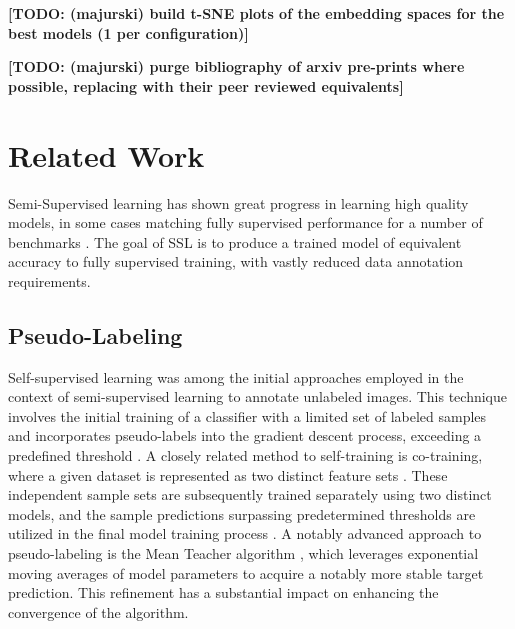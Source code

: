 \documentclass[10pt,twocolumn,letterpaper]{article}
\newcommand{\TODO}[1]{\textbf{\color{red}[TODO: #1]}}
\begin{document}

\TODO {(majurski) build t-SNE plots of the embedding spaces for the best models (1 per configuration)}

\TODO {(majurski) purge bibliography of arxiv pre-prints where possible, replacing with their peer reviewed equivalents}





\section{Related Work}



Semi-Supervised learning has shown great progress in learning high quality models, in some cases matching fully supervised performance for a number of benchmarks \cite{zhang2021flexmatch}.
The goal of SSL is to produce a trained model of equivalent accuracy to fully supervised training, with vastly reduced data annotation requirements.

\subsection{Pseudo-Labeling}
Self-supervised learning was among the initial approaches employed in the context of semi-supervised learning to annotate unlabeled images. 
This technique involves the initial training of a classifier with a limited set of labeled samples and incorporates pseudo-labels into the gradient descent process, exceeding a predefined threshold \cite{yarowsky1995unsupervised, mcclosky2006reranking, olivier2006semi,zhai2019s4l,livieris2019predicting,rosenberg2005semi,menon2020deep}. 
A closely related method to self-training is co-training, where a given dataset is represented as two distinct feature sets \cite{blum1998combining}. 
These independent sample sets are subsequently trained separately using two distinct models, and the sample predictions surpassing predetermined thresholds are utilized in the final model training process \cite{blum1998combining,prakash2014survey}.
A notably advanced approach to pseudo-labeling is the Mean Teacher algorithm \cite{tarvainen2017mean}, which leverages exponential moving averages of model parameters to acquire a notably more stable target prediction. 
This refinement has a substantial impact on enhancing the convergence of the algorithm.
\end{document}
